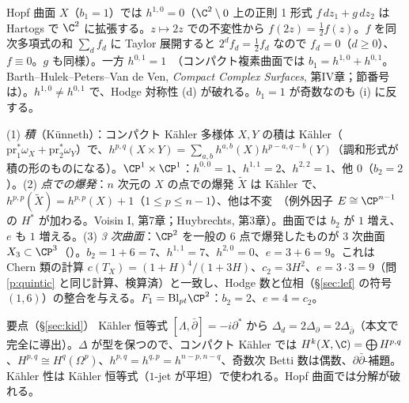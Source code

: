 \begin{ex}\label{ex:hopfH}
Hopf 曲面 $X$（$b_1=1$）では $h^{1,0}=0$（$\C^2\setminus0$ 上の正則 1 形式 $f\,dz_1+g\,dz_2$ は Hartogs で $\C^2$ に拡張する。$z\mapsto2z$ での不変性から $f(2z)=\frac12f(z)$。$f$ を同次多項式の和 $\sum_df_d$ に Taylor 展開すると $2^df_d=\frac12f_d$ なので $f_d=0$（$d\ge0$）、$f\equiv0$。$g$ も同様）。一方 $h^{0,1}=1$\tC\ （コンパクト複素曲面では $b_1=h^{1,0}+h^{0,1}$。Barth--Hulek--Peters--Van de Ven, \emph{Compact Complex Surfaces}, 第IV章；節番号は\tQ）。$h^{1,0}\ne h^{0,1}$ で、Hodge 対称性 (d) が破れる。$b_1=1$ が奇数なのも (i) に反する。
\end{ex}

\begin{ex}\label{ex:prodbl}
(1) \emph{積}（Künneth）：コンパクト Kähler 多様体 $X,Y$ の積は Kähler（$\mathrm{pr}_1^*\omega_X+\mathrm{pr}_2^*\omega_Y$）で、$h^{p,q}(X\times Y)=\sum_{a,b}h^{a,b}(X)h^{p-a,q-b}(Y)$（調和形式が積の形のものになる）。$\CP^1\times\CP^1$：$h^{0,0}=1$、$h^{1,1}=2$、$h^{2,2}=1$、他 $0$（$b_2=2$）。(2) \emph{点での爆発}：$n$ 次元の $X$ の点での爆発 $\tilde X$ は Kähler で、$h^{p,p}(\tilde X)=h^{p,p}(X)+1$（$1\le p\le n-1$）、他は不変\tC\ （例外因子 $E\cong\CP^{n-1}$ の $H^*$ が加わる。Voisin I, 第7章；Huybrechts, 第3章）。曲面では $b_2$ が $1$ 増え、$e$ も $1$ 増える。(3) \emph{3 次曲面}：$\CP^2$ を一般の 6 点で爆発したものが 3 次曲面 $X_3\subset\CP^3$（\tC）。$b_2=1+6=7$、$h^{1,1}=7$、$h^{2,0}=0$、$e=3+6=9$。これは Chern 類の計算 $c(T_X)=(1+H)^4/(1+3H)$、$c_2=3H^2$、$e=3\cdot3=9$（問 \ref{p:quintic} と同じ計算、検算済）と一致し、Hodge 数と位相（\S\ref{sec:lef} の符号 $(1,6)$）の整合を与える。$F_1=\mathrm{Bl}_{pt}\CP^2$：$b_2=2$、$e=4=c_2$。
\end{ex}

\begin{keybox}{要点（\S\ref{sec:kid}）}
Kähler 恒等式 $[\Lambda,\bar\partial]=-i\partial^*$ から $\Delta_d=2\Delta_\partial=2\Delta_{\bar\partial}$（本文で完全に導出）。$\Delta$ が型を保つので、コンパクト Kähler では $H^k(X,\C)=\bigoplus H^{p,q}$、$H^{p,q}\cong H^q(\Omega^p)$、$h^{p,q}=h^{q,p}=h^{n-p,n-q}$、奇数次 Betti 数は偶数、$\partial\bar\partial$-補題。Kähler 性は Kähler 恒等式（$1$-jet が平坦）で使われる。Hopf 曲面では分解が破れる。
\end{keybox}

